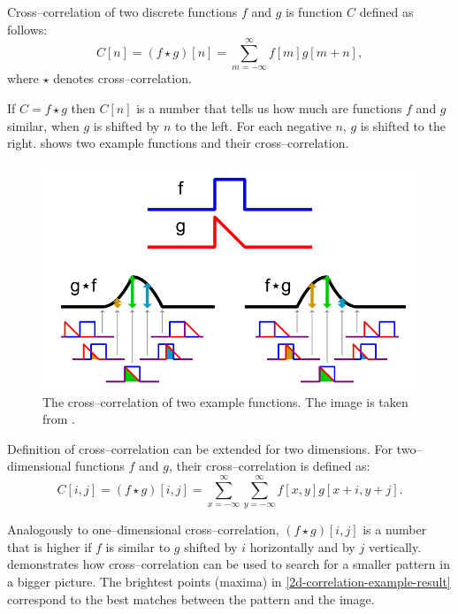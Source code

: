 Cross--correlation of two discrete functions $f$ and $g$ is function $C$ defined as follows:
\[
C[n] = (f \star g)[n] = \sum_{m=-\infty}^{\infty}f[m]g[m+n],
\]
where $\star$ denotes cross--correlation.

If $C = f \star g$ then $C[n]$ is a number that tells us how much are functions $f$ and $g$ similar, when $g$ is shifted by $n$ to the left. For each negative $n$, $g$ is shifted to the right.  shows two example functions and their cross--correlation.

\begin{figure}
	\centering
	\includegraphics[width=0.7\linewidth]{img/correlation}
	\caption{The cross--correlation of two example functions. The image is taken from \cite{correlation_example}.}
	\label{correlation-example}
\end{figure}

Definition of cross--correlation can be extended for two dimensions. For two--dimensional functions $f$ and $g$, their cross--correlation is defined as:
\[
C[i,j] = (f \star g)[i,j] = \sum_{x=-\infty}^{\infty}\sum_{y=-\infty}^{\infty}f[x,y]g[x+i,y+j].
\]

Analogously to one--dimensional cross--correlation, $(f \star g)[i,j]$ is a number that is higher if $f$ is similar to $g$ shifted by $i$ horizontally and by $j$ vertically.  demonstrates how cross--correlation can be used to search for a smaller pattern in a bigger picture. The brightest points (maxima) in \cref{2d-correlation-example-result} correspond to the best matches between the pattern and the image.


